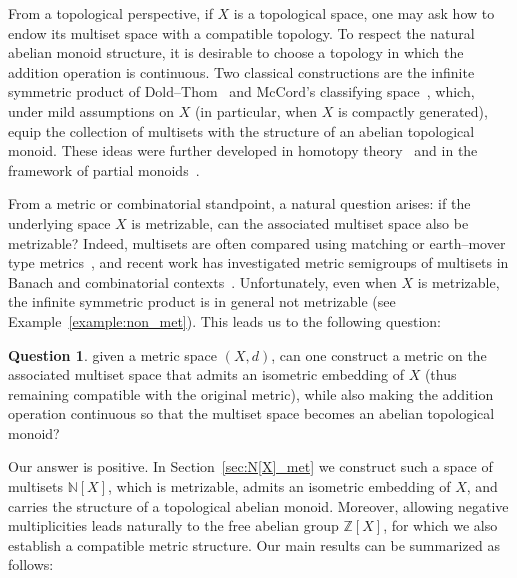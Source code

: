 \documentclass[10pt,a4paper]{article}
\theoremstyle{definition}
\newtheorem*{question}{Question}
\newcommand{\Z}{\mathbb{Z}}
\newcommand{\N}{\mathbb{N}}
\begin{document}
From a topological perspective, if $X$ is a topological space, one may ask how
to endow its multiset space with a compatible topology.  
To respect the natural abelian monoid structure, it is desirable to choose a
topology in which the addition operation is continuous.  
Two classical constructions are the infinite symmetric product of
Dold--Thom~\cite{dold1958quasifaserungen} and McCord’s classifying
space~\cite{mccord1969classifying}, which, under mild assumptions on $X$
(in particular, when $X$ is compactly generated), equip the collection of
multisets with the structure of an abelian topological monoid.  
These ideas were further developed in homotopy theory~\cite{bandklayder2019dold} and in the framework of
partial monoids~\cite{mostovoy2007partial}.

From a metric or combinatorial standpoint, a natural question arises: if the
underlying space $X$ is metrizable, can the associated multiset space also be
metrizable?  
Indeed, multisets are often compared using matching or earth–mover type
metrics~\cite{chen2018metric}, and recent work has investigated metric
semigroups of multisets in Banach and combinatorial
contexts~\cite{dolishniak2024metric}.  
Unfortunately, even when $X$ is metrizable, the infinite symmetric product is in
general not metrizable (see Example~\ref{example:non_met}).
This leads us to the following question:
\begin{framed}
\begin{question} 
given a metric space $(X,d)$, can one
construct a metric on the associated multiset space that admits an isometric
embedding of $X$ (thus remaining compatible with the original metric), while
also making the addition operation continuous so that the multiset space becomes
an abelian topological monoid? 
\end{question}
\end{framed}
\vspace{2mm}
Our answer is positive.  
In Section~\ref{sec:N[X]_met} we construct such a space of multisets $\N[X]$, which is
metrizable, admits an isometric embedding of $X$, and carries the structure of a
topological abelian monoid.  
Moreover, allowing negative multiplicities leads naturally to the free abelian
group $\Z[X]$, for which we also establish a compatible metric structure.  
Our main results can be summarized as follows:
\end{document}
